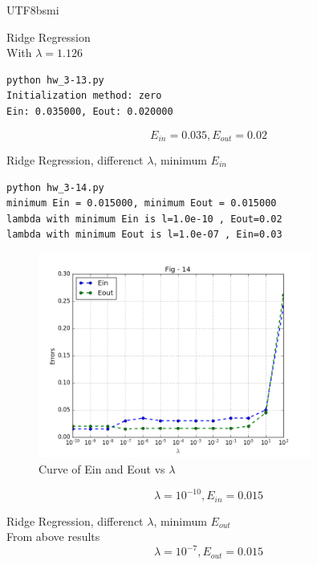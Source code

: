 \documentclass[12pt]{article}
\newenvironment{prob}[2][Prob.]{\begin{trivlist}
\item[\hskip \labelsep {\bfseries #1}\hskip \labelsep {\bfseries #2}]}{\end{trivlist}}
\begin{document}
\begin{CJK}{UTF8}{bsmi}
\begin{prob}{13} Ridge Regression \\
With $\lambda = 1.126$
\begin{lstlisting}
python hw_3-13.py
Initialization method: zero
Ein: 0.035000, Eout: 0.020000
\end{lstlisting}
\[
    E_{in} = 0.035, E_{out} = 0.02
\]
\end{prob}


\begin{prob}{14} Ridge Regression, differenct $\lambda$, minimum $E_{in}$\\
\begin{lstlisting}
python hw_3-14.py
minimum Ein = 0.015000, minimum Eout = 0.015000
lambda with minimum Ein is l=1.0e-10 , Eout=0.02
lambda with minimum Eout is l=1.0e-07 , Ein=0.03
\end{lstlisting}
\begin{figure}[H]
	\centering
	\includegraphics[width=0.8\textwidth]{../results/figure_14.png}
	\caption{Curve of Ein and Eout vs $\lambda$}
\end{figure}
\[
    \lambda = 10^{-10}, E_{in} = 0.015
\]
\end{prob}

\begin{prob}{15} Ridge Regression, differenct $\lambda$, minimum $E_{out}$\\
From above results
\[
    \lambda = 10^{-7}, E_{out} = 0.015
\]
\end{prob}


\end{CJK}
\end{document}
